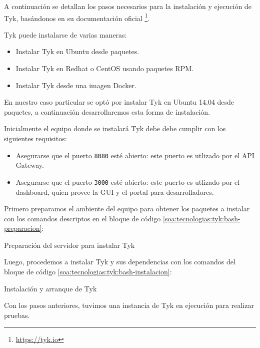 A continuación se detallan los pasos necesarios para la instalación y ejecución de Tyk, basándonos en su documentación oficial \footnote{\url{https://tyk.io}}.

Tyk puede instalarse de varias maneras:

\begin{itemize}
  \item Instalar Tyk en Ubuntu desde paquetes.
  \item Instalar Tyk en Redhat o CentOS usando paquetes RPM.
  \item Instalar Tyk desde una imagen Docker.
\end{itemize}

En nuestro caso particular se optó por instalar Tyk en Ubuntu 14.04 desde paquetes, a continuación desarrollaremos esta forma de instalación.

Inicialmente el equipo donde se instalará Tyk debe debe cumplir con los siguientes requisitos:

\begin{itemize}
  \item Asegurarse que el puerto \texttt{8080} esté abierto: este puerto es utlizado por el API Gateway.
  \item Asegurarse que el puerto \texttt{3000} esté abierto: este puerto es utlizado por el dashboard, quien provee la GUI y el portal para desarrolladores.
\end{itemize}

Primero preparamos el ambiente del equipo para obtener los paquetes a instalar con los comandos descriptos en el bloque de código \autoref{soa:tecnologias:tyk:bash-preparacion}:

\begin{listing}[H]
  \caption{Preparación del servidor para instalar Tyk}
  \label{soa:tecnologias:tyk:bash-preparacion}
\end{listing}

Luego, procedemos a instalar Tyk y sus dependencias con los comandos del bloque de código \autoref{soa:tecnologias:tyk:bash-instalacion}:

\begin{listing}[H]
  \caption{Instalación y arranque de Tyk}
  \label{soa:tecnologias:tyk:bash-instalacion}
\end{listing}

Con los pasos anteriores, tuvimos una instancia de Tyk en ejecución para realizar pruebas.

